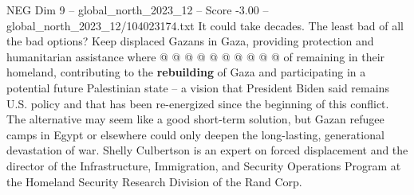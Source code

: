 \begin{textsample}{NEG Dim 9 – global\_north\_2023\_12 – Score -3.00 – global\_north\_2023\_12/104023174.txt}
It could take decades.
The least bad of all the bad options?
Keep displaced Gazans in Gaza, providing protection and humanitarian assistance where @ @ @ @ @ @ @ @ @ @ of remaining in their homeland, contributing to the \textbf{rebuilding} of Gaza and participating in a potential future Palestinian state -- a vision that President Biden said remains U.S. policy and that has been re-energized since the beginning of this conflict.
The alternative may seem like a good short-term solution, but Gazan refugee camps in Egypt or elsewhere could only deepen the long-lasting, generational devastation of war.
Shelly Culbertson is an expert on forced displacement and the director of the Infrastructure, Immigration, and Security Operations Program at the Homeland Security Research Division of the Rand Corp.

\end{textsample}
